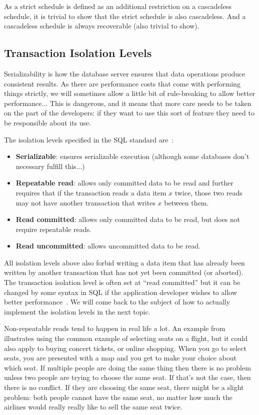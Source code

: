 \documentclass[a4paper]{report}
\begin{document}
As a strict schedule is defined as an additional restriction on a cascadeless schedule, it is trivial to show that the strict schedule is also cascadeless.  And a cascadeless schedule is always recoverable (also trivial to show). 

\subsection*{Transaction Isolation Levels}

Serializability is how the database server ensures that data operations produce consistent results. As there are performance costs that come with performing things strictly, we will sometimes allow a little bit of rule-breaking to allow better performance... This is dangerous, and it means that more care needs to be taken on the part of the developers: if they want to use this sort of feature they need to be responsible about its use.

The isolation levels specified in the SQL standard are~\cite{dsc}:
\begin{itemize}
	\item \textbf{Serializable}: ensures serializable execution (although some databases don't necessary fulfill this...)
	\item \textbf{Repeatable read}: allows only committed data to be read and further requires that if the transaction reads a data item $x$ twice, those two reads may not have another transaction that writes $x$ between them.
	\item \textbf{Read committed}: allows only committed data to be read, but does not require repeatable reads.
	\item \textbf{Read uncommitted}: allows uncommitted data to be read.
\end{itemize}

All isolation levels above also forbid writing a data item that has already been written by another transaction that has not yet been committed (or aborted). The transaction isolation level is often set at ``read committed'' but it can be changed by some syntax in SQL if the application developer wishes to allow better performance~\cite{dsc}. We will come back to the subject of how to actually implement the isolation levels in the next topic.

Non-repeatable reads tend to happen in real life a lot. An example from~\cite{dsc} illustrates using the common example of selecting seats on a flight, but it could also apply to buying concert tickets, or online shopping. When you go to select seats, you are presented with a map and you get to make your choice about which seat. If multiple people are doing the same thing then there is no problem unless two people are trying to choose the same seat. If that's not the case, then there is no conflict. If they are choosing the same seat, there might be a slight problem: both people cannot have the same seat, no matter how much the airlines would really really like to sell the same seat twice.
\end{document}
